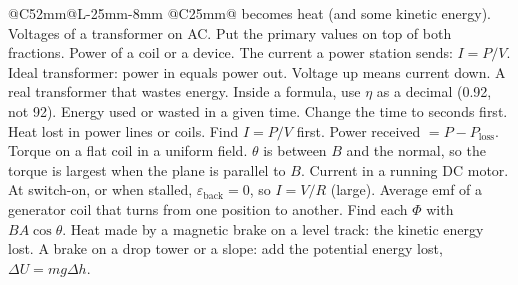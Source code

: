 {\begin{longtable}{@{}C{52mm}@{\hspace{4mm}}L{\dimexpr\linewidth-52mm-25mm-8mm\relax}%
    @{\hspace{4mm}}C{25mm}@{}}
{    becomes heat (and some kinetic energy).}
    {Voltages of a transformer on AC. Put the primary values on top of both fractions.}
    {Power of a coil or a device. The current a power station sends: $I = P/V$.}
    {Ideal transformer: power in equals power out. Voltage up means current down.}
    {A real transformer that wastes energy. Inside a formula, use $\eta$ as a decimal
     (0.92, not 92).}
    {Energy used or wasted in a given time. Change the time to seconds first.}
    {Heat lost in power lines or coils. Find $I = P/V$ first. Power received
     $= P - P_\mathrm{loss}$.}
    {Torque on a flat coil in a uniform field. $\theta$ is between $B$ and the normal, so the
     torque is largest when the plane is parallel to $B$.}
    {Current in a running DC motor. At switch-on, or when stalled, $\varepsilon_\mathrm{back}
     = 0$, so $I = V/R$ (large).}
    {Average emf of a generator coil that turns from one position to another. Find each
     $\Phi$ with $BA\cos\theta$.}
    {Heat made by a magnetic brake on a level track: the kinetic energy lost.}
    {A brake on a drop tower or a slope: add the potential energy lost, $\Delta U =
    mg\Delta h$.}
\end{longtable}}

